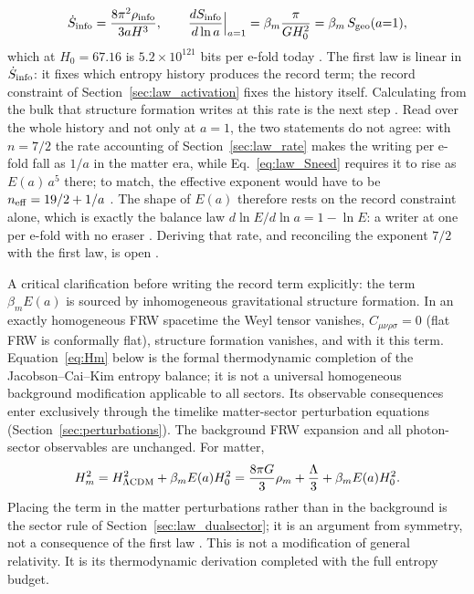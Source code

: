 \begin{equation}
\dot S_{\rm info}=\frac{8\pi^2\rho_{\rm info}}{3aH^3},\qquad \frac{dS_{\rm info}}{d\ln a}\Big|_{a=1}=\beta_m\frac{\pi}{GH_0^2}=\beta_m\,S_{\rm geo}(a{=}1),
\label{eq:law_Sneed}
\end{equation}
which at $H_0=67.16$ is $5.2\times10^{121}$ bits per e-fold today \calc. The first law is linear in $\dot S_{\rm info}$: it fixes which entropy history produces
the record term; the record constraint of Section~\ref{sec:law_activation} fixes the history itself. Calculating from the bulk that structure formation writes at this rate is the next step \openprob. Read over the whole history and not only at $a=1$, the two statements do not agree: with $n=7/2$ the rate accounting of Section~\ref{sec:law_rate} makes the writing per e-fold fall as $1/a$ in the matter era, while Eq.~\eqref{eq:law_Sneed} requires it to rise as $E(a)\,a^5$ there; to match, the effective exponent would have to be $n_{\rm eff}=19/2+1/a$ \calc. The shape of $E(a)$ therefore rests on the record constraint alone, which is exactly the balance law $d\ln E/d\ln a=1-\ln E$: a writer at one per e-fold with no eraser \derived. Deriving that rate, and reconciling the exponent $7/2$ with the first law, is open \openprob.

A critical clarification before writing the record term explicitly: the term $\beta_mE(a)$ is sourced by inhomogeneous gravitational structure formation.
In an exactly homogeneous FRW spacetime the Weyl tensor vanishes, $C_{\mu\nu\rho\sigma}=0$ (flat FRW is conformally flat), structure formation vanishes, and
with it this term. Equation~\eqref{eq:Hm} below is the formal thermodynamic completion of the Jacobson--Cai--Kim entropy balance; it is not a universal
homogeneous background modification applicable to all sectors. Its observable consequences enter exclusively through the timelike matter-sector
perturbation equations (Section~\ref{sec:perturbations}). The background FRW expansion and all photon-sector observables are unchanged. For matter,
\begin{equation}
H_m^2=H_{\Lambda{\rm CDM}}^2+\beta_mE(a)H_0^2=\frac{8\pi G}{3}\rho_m+\frac\Lambda3+\beta_mE(a)H_0^2 . \label{eq:Hm}
\end{equation}
Placing the term in the matter perturbations rather than in the background is the sector rule of Section~\ref{sec:law_dualsector}; it is an argument from
symmetry, not a consequence of the first law \conjecture. This is not a modification of general relativity. It is its thermodynamic derivation completed
with the full entropy budget.

